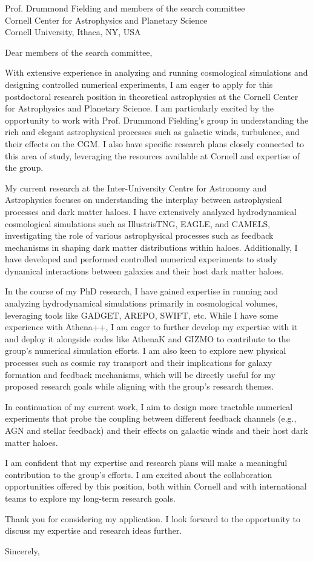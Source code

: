\documentclass[11pt]{letter}
\begin{document}
\begin{letter}{Prof. Drummond Fielding and members of the search committee \\ Cornell Center for Astrophysics and Planetary Science \\ Cornell University, Ithaca, NY, USA}

\opening{Dear members of the search committee,}

With extensive experience in analyzing and running cosmological simulations and designing controlled numerical experiments, I am eager to apply for this postdoctoral research position in theoretical astrophysics at the Cornell Center for Astrophysics and Planetary Science. I am particularly excited by the opportunity to work with Prof. Drummond Fielding's group in understanding the rich and elegant astrophysical processes such as galactic winds, turbulence, and their effects on the CGM. I also have specific research plans closely connected to this area of study, leveraging the resources available at Cornell and expertise of the group.

My current research at the Inter-University Centre for Astronomy and Astrophysics focuses on understanding the interplay between astrophysical processes and dark matter haloes. I have extensively analyzed hydrodynamical cosmological simulations such as IllustrisTNG, EAGLE, and CAMELS, investigating the role of various astrophysical processes such as feedback mechanisms in shaping dark matter distributions within haloes. Additionally, I have developed and performed controlled numerical experiments to study dynamical interactions between galaxies and their host dark matter haloes. 

In the course of my PhD research, I have gained expertise in running and analyzing hydrodynamical simulations primarily in cosmological volumes, leveraging tools like GADGET, AREPO, SWIFT, etc. While I have some experience with Athena++, I am eager to further develop my expertise with it and deploy it  alongside codes like AthenaK and GIZMO to contribute to the group's numerical simulation efforts. I am also keen to explore new physical processes such as cosmic ray transport and their implications for galaxy formation and feedback mechanisms, which will be directly useful for my proposed research goals while aligning with the group's research themes.

In continuation of my current work, I aim to design more tractable numerical experiments that probe the coupling between different feedback channels (e.g., AGN and stellar feedback) and their effects on galactic winds and their host dark matter haloes.  

I am confident that my expertise and research plans will make a meaningful contribution to the group's efforts. I am excited about the collaboration opportunities offered by this position, both within Cornell and with international teams to explore my long-term research goals.

Thank you for considering my application. I look forward to the opportunity to discuss my expertise and research ideas further.  

\closing{Sincerely,}

\end{letter}
\end{document}
